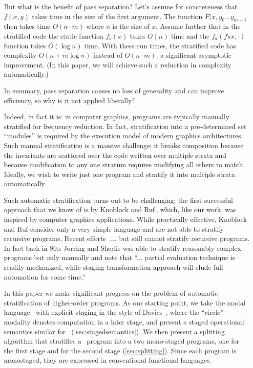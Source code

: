 But what is the benefit of pass separation? Let's assume for
concreteness that $f(x,y)$ takes time in the size of the first
argument.  The function $F(x, y_0 \ldots y_{m-1}$ then takes time $O(n
\cdot m)$ where $n$ is the size of $x$. Assume further that in the
stratified code the static function $f_s(x)$ takes $O(n)$ time and the
$f_d(fsx, \cdot)$ function takes $O(\log{n})$ time.  With these run
times, the stratified code has complexity $O(n + m\log{n})$ instead of
$O(n \cdot m)$, a significant asymptotic improvement.  (In this paper,
we will achieve such a reduction in complexity automatically.)

In summary, pass separation causes no loss of generality and can
improve efficiency, so why is it not applied liberally? 

Indeed, in fact it is: in computer graphics, programs are typically
manually stratified for frequency reduction.  In fact, stratification
into a pre-determined set ``modules'' is required by the execution
model of modern graphics architectures.  Such manual stratification is
a massive challenge: it breaks composition because the invariants are
scattered over the code written over multiple strata and because
modification to any one stratum requires modifying all others to
match.  Ideally, we wish to write just one program and stratify it
into multiple strata automatically.

Such automatic stratification turns out to be challenging: the first
successful approach that we know of is by Knoblock and
Ruf\,\cite{knoblock96}, which, like our work, was inspired by computer
graphics applications.  While practically effective, Knoblock and Ruf
consider only a very simple language and are not able to stratify
recursive programs.  Recent
efforts\,\cite{Proudfoot:2001,Foley:2011,He:2014} .... 
but still cannot stratify recursive programs.
%
In fact back in 80,s Jorring and Sherlis was able to stratify
reasonably complex programs but only manually and note that
``... partial evaluation technique is readily mechanized, while
staging transformation approach will elude full automation for some
time.''

In this paper we make significant progress on the problem of automatic
stratification of higher-order programs.  As our starting point, we
take the modal language \lang\ with explicit staging in the style
of Davies~\cite{davies96}, where the ``circle'' modality denotes
computation in a later stage, and present a staged operational
semantics similar for \lang\ (\ref{sec:stagedsemantics}).  We then present
a splitting algorithm that stratifies a \lang\ program into a two
mono-staged programs, one for the first stage and for the second stage
(\ref{sec:splitting}).  Since each program is monostaged, they are
expressed in conventional functional languages.

